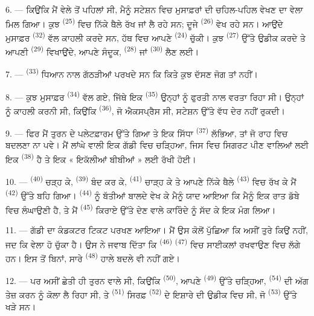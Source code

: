 6. --- ਕਿਉਂਕਿ ਮੈਂ ਵੇਲੇ ਤੋਂ ਪਹਿਲਾਂ ਸੀ, ਮੈਨੂੰ ਸਟੇਸ਼ਨ ਵਿਚ ਮੁਸਾਫ਼ਰਾਂ ਦੀ ਚਹਿਲ-ਪਹਿਲ ਵੇਖਣ
ਦਾ ਵੇਲਾ ਮਿਲ ਗਿਆ। ਕੁਝ  \textsuperscript{(25)} ਵਿਚ ਨਿੱਕੇ ਥੈਲੇ ਰੱਖ
ਜਾਂ ਲੈ ਰਹੇ ਸਨ; ਦੂਜੇ  \textsuperscript{(26)} ਵੇਖ ਰਹੇ ਸਨ।
ਆਉਂਦੇ ਮੁਸਾਫ਼ਰ  \textsuperscript{(32)} ਵੱਲ ਕਾਹਲੀ ਕਰਦੇ ਸਨ, ਹੱਥ ਵਿਚ ਆਪਣੇ
 \textsuperscript{(24)} ਚੁੱਕੀ। ਕੁਝ 
\textsuperscript{(27)} ਉੱਤੇ ਉਡੀਕ ਕਰਦੇ ਤੇ ਆਪਣੀ  \textsuperscript{(29)}
ਵਿਖਾਉਂਦੇ, ਆਪਣੇ ਸੰਦੂਕ,  \textsuperscript{(28)} ਜਾਂ
 \textsuperscript{(30)} ਲੈਣ ਲਈ।

7. ---  \textsuperscript{(33)} ਧਿਆਨ ਨਾਲ ਗੱਠੜੀਆਂ ਪਰਖਦੇ ਸਨ
ਕਿ ਕਿਤੇ ਕੁਝ ਦੱਸਣ ਜੋਗ ਤਾਂ ਨਹੀਂ।

8. --- ਕੁਝ ਮੁਸਾਫ਼ਰ  \textsuperscript{(34)} ਵੱਲ ਗਏ, ਜਿੱਥੇ
ਇਕ  \textsuperscript{(35)} ਉਨ੍ਹਾਂ ਨੂੰ ਫੁਰਤੀ ਨਾਲ ਵਰਤਾ ਰਿਹਾ ਸੀ। ਉਨ੍ਹਾਂ
ਨੂੰ ਕਾਹਲੀ ਕਰਨੀ ਸੀ, ਕਿਉਂਕਿ  \textsuperscript{(36)}, ਜੋ ਐਕਸਪ੍ਰੈਸ ਸੀ,
ਸਟੇਸ਼ਨ ਉੱਤੇ ਵੱਧ ਦੇਰ ਨਹੀਂ ਰੁਕਦੀ।

9. --- ਫਿਰ ਮੈਂ ਤੁਰਨ ਦੇ ਪਲੇਟਫ਼ਾਰਮ ਉੱਤੇ ਗਿਆ ਤੇ ਇਕ ਸਿੱਧਾ 
\textsuperscript{(37)} ਲੱਭਿਆ, ਤਾਂ ਜੋ ਰਾਹ ਵਿਚ ਬਦਲਣਾ ਨਾ ਪਵੇ। ਮੈਂ ਲਾਂਘੇ ਵਾਲੀ ਇਕ ਗੱਡੀ
ਵਿਚ ਚੜ੍ਹਿਆ, ਜਿਸ ਵਿਚ ਸਿਗਰਟ ਪੀਣ ਵਾਲਿਆਂ ਲਈ ਇਕ  \textsuperscript{(38)}
ਹੈ ਤੇ ਇਕ « ਇਕੱਲੀਆਂ ਬੀਬੀਆਂ » ਲਈ ਰੱਖੀ ਹੋਈ।

\VUsaut{3.0mm}

10. ---  \textsuperscript{(40)} ਚੜ੍ਹ ਕੇ, 
\textsuperscript{(39)} ਬੰਦ ਕਰ ਕੇ,  \textsuperscript{(41)} ਚਾੜ੍ਹ ਕੇ ਤੇ
ਆਪਣੇ ਨਿੱਕੇ ਥੈਲੇ  \textsuperscript{(43)} ਵਿਚ ਰੱਖ ਕੇ ਮੈਂ
 \textsuperscript{(42)} ਉੱਤੇ ਬਹਿ ਗਿਆ। 
\textsuperscript{(44)} ਨੂੰ ਬੱਤੀਆਂ ਬਾਲਦੇ ਵੇਖ ਕੇ ਮੈਨੂੰ ਯਾਦ ਆਇਆ ਕਿ ਮੈਨੂੰ ਇਕ ਰਾਤ ਡੱਬੇ
ਵਿਚ ਲੰਘਾਉਣੀ ਹੈ, ਤੇ ਮੈਂ  \textsuperscript{(45)} ਕਿਰਾਏ ਉੱਤੇ ਦੇਣ ਵਾਲੇ
ਕਾਰਿੰਦੇ ਨੂੰ ਸੱਦ ਕੇ ਇਕ ਮੰਗ ਲਿਆ।

11. --- ਗੱਡੀ ਦਾ ਕੰਡਕਟਰ ਟਿਕਟ ਪਰਖਣ ਆਇਆ। ਮੈਂ ਉਸ ਕੋਲੋਂ ਪੁੱਛਿਆ ਕਿ ਅਸੀਂ ਤੁਰੇ ਕਿਉਂ
ਨਹੀਂ, ਜਦ ਕਿ ਵੇਲਾ ਹੋ ਚੁੱਕਾ ਹੈ। ਉਸ ਨੇ ਜਵਾਬ ਦਿੱਤਾ ਕਿ 
\textsuperscript{(46)}  \textsuperscript{(47)} ਵਿਚ ਸਾਈਕਲਾਂ
ਰਖਵਾਉਣ ਵਿਚ ਲੱਗੇ ਹਨ। ਇਸ ਤੋਂ ਬਿਨਾਂ, ਸਾਰੇ 
\textsuperscript{(48)} ਹਾਲੇ ਬਦਲੇ ਵੀ ਨਹੀਂ ਗਏ।

12. --- ਪਰ ਅਸੀਂ ਛੇਤੀ ਹੀ ਤੁਰਨ ਵਾਲੇ ਸੀ, ਕਿਉਂਕਿ 
\textsuperscript{(50)}, ਆਪਣੇ  \textsuperscript{(49)} ਉੱਤੇ
ਚੜ੍ਹਿਆ,  \textsuperscript{(54)} ਦੀ ਅੱਗ ਤੇਜ਼ ਕਰਨ ਨੂੰ ਕੋਲਾ ਲੈ ਰਿਹਾ ਸੀ, ਤੇ
 \textsuperscript{(51)} ਸਿਰਫ਼ 
\textsuperscript{(52)} ਦੇ ਇਸ਼ਾਰੇ ਦੀ ਉਡੀਕ ਵਿਚ ਸੀ, ਜੋ 
\textsuperscript{(53)} ਉੱਤੇ ਖੜੇ ਸਨ।


